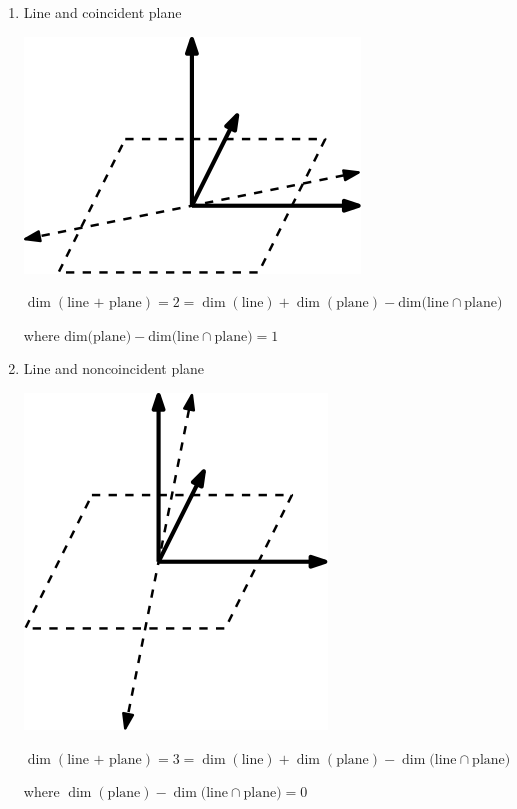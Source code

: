 \documentclass[11pt]{article}
\begin{document}
\begin{examples}
\begin{enumerate}
\item Line and coincident plane

\includegraphics[width=.9\linewidth]{./subspace_dim1.png} 

\(\dim(\text{line + plane}) = 2 = \dim(\text{line}) + \dim(\text{plane}) - \text{dim(line} \cap \text{plane)}\)

where \(\text{dim(plane)} - \text{dim(line} \cap \text{plane)} = 1\)

\item Line and noncoincident plane

\includegraphics[width=.9\linewidth]{./subspace_dim2.png} 

\(\dim(\text{line + plane}) = 3 = \dim(\text{line}) + \dim(\text{plane}) - \dim(\text{line} \cap \text{plane)}\)

where \(\dim(\text{plane}) - \dim(\text{line} \cap \text{plane)} = 0\)
\end{enumerate}
\end{examples}
\end{document}
